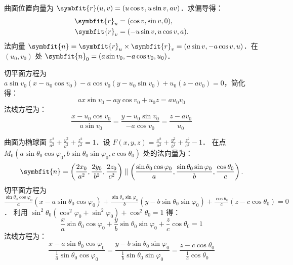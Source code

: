 \begin{solution}
    曲面位置向量为 $\symbfit{r}(u, v) = (u \cos v, u \sin v, av)$．求偏导得：
    \begin{equation}
        \begin{aligned}
            \symbfit{r}_u & = (\cos v, \sin v, 0),      \\
            \symbfit{r}_v & = (-u \sin v, u \cos v, a).
        \end{aligned}
    \end{equation}
    法向量 $\symbfit{n} = \symbfit{r}_u \times \symbfit{r}_v = (a \sin v, -a \cos v, u)$．在 $(u_0, v_0)$ 处 $\symbfit{n}_0 = (a \sin v_0, -a \cos v_0, u_0)$．

    切平面方程为 $a \sin v_0 (x - u_0 \cos v_0) - a \cos v_0 (y - u_0 \sin v_0) + u_0 (z - av_0) = 0$，简化得：
    \begin{equation}
        \boxed{ax \sin v_0 - ay \cos v_0 + u_0 z = a u_0 v_0}
    \end{equation}
    法线方程为：
    \begin{equation}
        \boxed{\frac{x - u_0 \cos v_0}{a \sin v_0} = \frac{y - u_0 \sin v_0}{-a \cos v_0} = \frac{z - av_0}{u_0}}
    \end{equation}

    曲面为椭球面 $\frac{x^2}{a^2} + \frac{y^2}{b^2} + \frac{z^2}{c^2} = 1$．设 $F(x,y,z) = \frac{x^2}{a^2} + \frac{y^2}{b^2} + \frac{z^2}{c^2} - 1$．
    在点 $M_0(a \sin \theta_0 \cos \varphi_0,\allowbreak b \sin \theta_0 \sin \varphi_0,\allowbreak c \cos \theta_0)$ 处的法向量为：
    \begin{equation}
        \symbfit{n} = \left( \frac{2x_0}{a^2}, \frac{2y_0}{b^2}, \frac{2z_0}{c^2} \right) \parallel \left( \frac{\sin \theta_0 \cos \varphi_0}{a}, \frac{\sin \theta_0 \sin \varphi_0}{b}, \frac{\cos \theta_0}{c} \right).
    \end{equation}
    切平面方程为 $\frac{\sin \theta_0 \cos \varphi_0}{a}(x - a \sin \theta_0 \cos \varphi_0) + \frac{\sin \theta_0 \sin \varphi_0}{b}(y - b \sin \theta_0 \sin \varphi_0) + \frac{\cos \theta_0}{c}(z - c \cos \theta_0) = 0$．
    利用 $\sin^2 \theta_0(\cos^2 \varphi_0 + \sin^2 \varphi_0) + \cos^2 \theta_0 = 1$ 得：
    \begin{equation}
        \boxed{\frac{x}{a} \sin \theta_0 \cos \varphi_0 + \frac{y}{b} \sin \theta_0 \sin \varphi_0 + \frac{z}{c} \cos \theta_0 = 1}
    \end{equation}
    法线方程为：
    \begin{equation}
        \boxed{\frac{x - a \sin \theta_0 \cos \varphi_0}{\frac{1}{a} \sin \theta_0 \cos \varphi_0} = \frac{y - b \sin \theta_0 \sin \varphi_0}{\frac{1}{b} \sin \theta_0 \sin \varphi_0} = \frac{z - c \cos \theta_0}{\frac{1}{c} \cos \theta_0}}
    \end{equation}
\end{solution}


